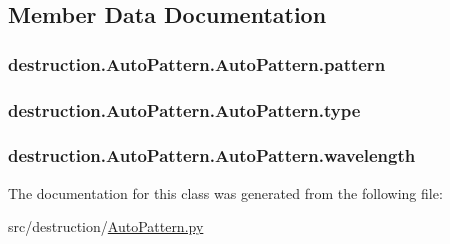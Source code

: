 \subsection{Member Data Documentation}
\hypertarget{classdestruction_1_1_auto_pattern_1_1_auto_pattern_a4c1f708cce5cef7e43de1bbcad455c77}{
\subsubsection[{pattern}]{\setlength{\rightskip}{0pt plus 5cm}destruction.\-Auto\-Pattern.\-Auto\-Pattern.\-pattern}}\label{classdestruction_1_1_auto_pattern_1_1_auto_pattern_a4c1f708cce5cef7e43de1bbcad455c77}
\hypertarget{classdestruction_1_1_auto_pattern_1_1_auto_pattern_a545d19cbea289efd27454aa926d2afa7}{
\subsubsection[{type}]{\setlength{\rightskip}{0pt plus 5cm}destruction.\-Auto\-Pattern.\-Auto\-Pattern.\-type}}\label{classdestruction_1_1_auto_pattern_1_1_auto_pattern_a545d19cbea289efd27454aa926d2afa7}
\hypertarget{classdestruction_1_1_auto_pattern_1_1_auto_pattern_a613cf32a6add0704adc926eb4f88dd61}{
\subsubsection[{wavelength}]{\setlength{\rightskip}{0pt plus 5cm}destruction.\-Auto\-Pattern.\-Auto\-Pattern.\-wavelength}}\label{classdestruction_1_1_auto_pattern_1_1_auto_pattern_a613cf32a6add0704adc926eb4f88dd61}


The documentation for this class was generated from the following file\-:\begin{DoxyCompactItemize}
\item 
src/destruction/\hyperlink{_auto_pattern_8py}{Auto\-Pattern.\-py}\end{DoxyCompactItemize}
